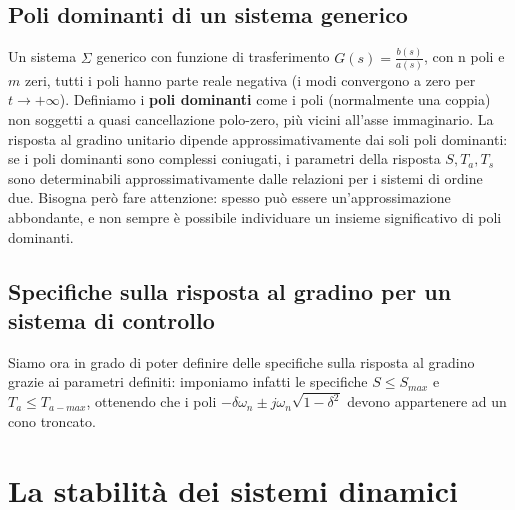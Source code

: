 \documentclass[11pt]{article}
\begin{document}
\subsection{Poli dominanti di un sistema generico}
Un sistema $\Sigma$ generico con funzione di trasferimento $G(s)=\frac{b(s)}{a(s)}$, con n poli e $m$ zeri, tutti i poli hanno parte reale negativa (i modi convergono a zero per $t\rightarrow+\infty$). Definiamo i \textbf{poli dominanti} come i poli (normalmente una coppia) non soggetti a quasi cancellazione polo-zero, più vicini all'asse immaginario. La risposta al gradino unitario dipende approssimativamente dai soli poli dominanti: se i poli dominanti sono complessi coniugati, i parametri della risposta $S, T_a, T_s$ sono determinabili approssimativamente dalle relazioni per i sistemi di ordine due. Bisogna però fare attenzione: spesso può essere un'approssimazione abbondante, e non sempre è possibile individuare un insieme significativo di poli dominanti.
\subsection{Specifiche sulla risposta al gradino per un sistema di controllo}
Siamo ora in grado di poter definire delle specifiche sulla risposta al gradino grazie ai parametri definiti: imponiamo infatti le specifiche $S \le S_{max}$ e $T_a \le T_{a-max}$, ottenendo che i poli $-\delta\omega_n \pm j\omega_n \sqrt{1-\delta^2}$ devono appartenere ad un cono troncato.

\section{La stabilità dei sistemi dinamici}
\end{document}
